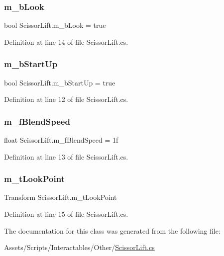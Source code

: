 \subsubsection{\texorpdfstring{m\+\_\+b\+Look}{m\_bLook}}
{\footnotesize\ttfamily bool Scissor\+Lift.\+m\+\_\+b\+Look = true}



Definition at line 14 of file Scissor\+Lift.\+cs.

\mbox{\label{class_scissor_lift_afd8b90f872372fd738ccc5b52dc672f0}} 
\subsubsection{\texorpdfstring{m\+\_\+b\+Start\+Up}{m\_bStartUp}}
{\footnotesize\ttfamily bool Scissor\+Lift.\+m\+\_\+b\+Start\+Up = true}



Definition at line 12 of file Scissor\+Lift.\+cs.

\mbox{\label{class_scissor_lift_ab25007401427378cb15e910f0f72af85}} 
\subsubsection{\texorpdfstring{m\+\_\+f\+Blend\+Speed}{m\_fBlendSpeed}}
{\footnotesize\ttfamily float Scissor\+Lift.\+m\+\_\+f\+Blend\+Speed = 1f}



Definition at line 13 of file Scissor\+Lift.\+cs.

\mbox{\label{class_scissor_lift_ad10e7174e2bf2c6ba4d0b5456d83dd7b}} 
\subsubsection{\texorpdfstring{m\+\_\+t\+Look\+Point}{m\_tLookPoint}}
{\footnotesize\ttfamily Transform Scissor\+Lift.\+m\+\_\+t\+Look\+Point}



Definition at line 15 of file Scissor\+Lift.\+cs.



The documentation for this class was generated from the following file\+:\begin{DoxyCompactItemize}
\item 
Assets/\+Scripts/\+Interactables/\+Other/\mbox{\hyperlink{_scissor_lift_8cs}{Scissor\+Lift.\+cs}}\end{DoxyCompactItemize}
